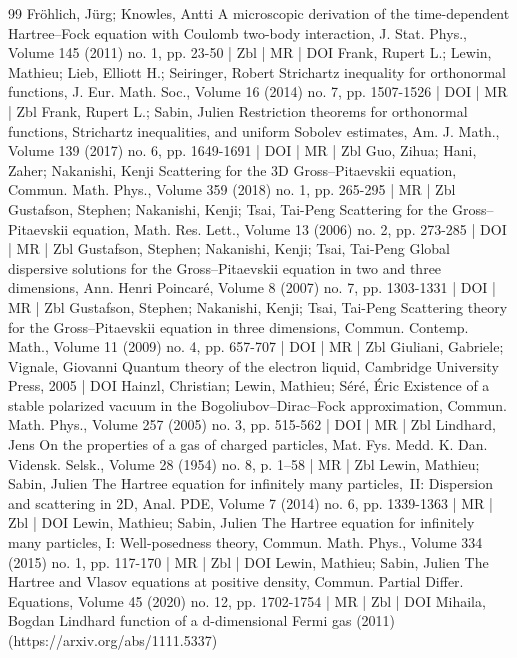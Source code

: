 \documentclass[10pt]{amsart}
\theoremstyle{definition}\newtheorem{defi}[theo]{Definition}\newtheorem{rema}[theo]{Remark}\newtheorem{exam}[theo]{Example}\newtheorem{exem}[theo]{Example}\newtheorem{nota}[theo]{Notation}
\begin{document}
\begin{thebibliography}{99}
Fröhlich, Jürg; Knowles, Antti A microscopic derivation of the time-dependent Hartree–Fock equation with Coulomb two-body interaction, J. Stat. Phys., Volume 145 (2011) no. 1, pp. 23-50 | Zbl | MR | DOI
Frank, Rupert L.; Lewin, Mathieu; Lieb, Elliott H.; Seiringer, Robert Strichartz inequality for orthonormal functions, J. Eur. Math. Soc., Volume 16 (2014) no. 7, pp. 1507-1526 | DOI | MR | Zbl
Frank, Rupert L.; Sabin, Julien Restriction theorems for orthonormal functions, Strichartz inequalities, and uniform Sobolev estimates, Am. J. Math., Volume 139 (2017) no. 6, pp. 1649-1691 | DOI | MR | Zbl
Guo, Zihua; Hani, Zaher; Nakanishi, Kenji Scattering for the 3D Gross–Pitaevskii equation, Commun. Math. Phys., Volume 359 (2018) no. 1, pp. 265-295 | MR | Zbl
Gustafson, Stephen; Nakanishi, Kenji; Tsai, Tai-Peng Scattering for the Gross–Pitaevskii equation, Math. Res. Lett., Volume 13 (2006) no. 2, pp. 273-285 | DOI | MR | Zbl
Gustafson, Stephen; Nakanishi, Kenji; Tsai, Tai-Peng Global dispersive solutions for the Gross–Pitaevskii equation in two and three dimensions, Ann. Henri Poincaré, Volume 8 (2007) no. 7, pp. 1303-1331 | DOI | MR | Zbl
Gustafson, Stephen; Nakanishi, Kenji; Tsai, Tai-Peng Scattering theory for the Gross–Pitaevskii equation in three dimensions, Commun. Contemp. Math., Volume 11 (2009) no. 4, pp. 657-707 | DOI | MR | Zbl
Giuliani, Gabriele; Vignale, Giovanni Quantum theory of the electron liquid, Cambridge University Press, 2005 | DOI
Hainzl, Christian; Lewin, Mathieu; Séré, Éric Existence of a stable polarized vacuum in the Bogoliubov–Dirac–Fock approximation, Commun. Math. Phys., Volume 257 (2005) no. 3, pp. 515-562 | DOI | MR | Zbl
Lindhard, Jens On the properties of a gas of charged particles, Mat. Fys. Medd. K. Dan. Vidensk. Selsk., Volume 28 (1954) no. 8, p. 1--58 | MR | Zbl
Lewin, Mathieu; Sabin, Julien The Hartree equation for infinitely many particles, II: Dispersion and scattering in 2D, Anal. PDE, Volume 7 (2014) no. 6, pp. 1339-1363 | MR | Zbl | DOI
Lewin, Mathieu; Sabin, Julien The Hartree equation for infinitely many particles, I: Well-posedness theory, Commun. Math. Phys., Volume 334 (2015) no. 1, pp. 117-170 | MR | Zbl | DOI
Lewin, Mathieu; Sabin, Julien The Hartree and Vlasov equations at positive density, Commun. Partial Differ. Equations, Volume 45 (2020) no. 12, pp. 1702-1754 | MR | Zbl | DOI
Mihaila, Bogdan Lindhard function of a d-dimensional Fermi gas (2011) (https://arxiv.org/abs/1111.5337)

\end{thebibliography}
\end{document}
